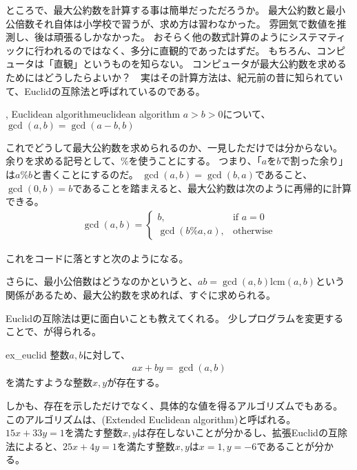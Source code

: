 ところで、最大公約数を計算する事は簡単だっただろうか。
最大公約数と最小公倍数それ自体は小学校で習うが、求め方は習わなかった。
雰囲気で数値を推測し、後は頑張るしかなかった。
おそらく他の数式計算のようにシステマティックに行われるのではなく、多分に直観的であったはずだ。
もちろん、コンピュータは「直観」というものを知らない。
コンピュータが最大公約数を求めるためにはどうしたらよいか？　実はその計算方法は、紀元前の昔に知られていて、Euclidの互除法と呼ばれているのである。

\begin{Theo}{, Euclidean algorithm}{euclidean algorithm}
$a>b>0$について、$\gcd(a,b) = \gcd(a - b, b)$
\end{Theo}

これでどうして最大公約数を求められるのか、一見しただけでは分からない。
余りを求める記号として、$\%$を使うことにする。
つまり、「$a$を$b$で割った余り」は$a \% b$と書くことにするのだ。
$\gcd(a,b)=\gcd(b,a)$であること、$\gcd(0,b)=b$であることを踏まえると、最大公約数は次のように再帰的に計算できる。
\begin{align*}
\gcd(a,b) =
\begin{cases}
b, &\mbox{if } a = 0\\
\gcd(b \% a, a), &\mbox{otherwise}
\end{cases}
\end{align*}

これをコードに落とすと次のようになる。


さらに、最小公倍数はどうなのかというと、$ab = \gcd(a,b)\mbox{lcm}(a,b)$という関係があるため、最大公約数を求めれば、すぐに求められる。


Euclidの互除法は更に面白いことも教えてくれる。
少しプログラムを変更することで、が得られる。

\begin{Theo}{}{ex_euclid}
整数$a,b$に対して、
\begin{align*}
ax + by = \gcd(a,b)
\end{align*}
を満たすような整数$x,y$が存在する。
\end{Theo}

しかも、存在を示しただけでなく、具体的な値を得るアルゴリズムでもある。
このアルゴリズムは、(Extended Euclidean algorithm)と呼ばれる。
$15x+33y=1$を満たす整数$x,y$は存在しないことが分かるし、拡張Euclidの互除法によると、$25x+4y=1$を満たす整数$x,y$は$x=1,y=-6$であることが分かる。

